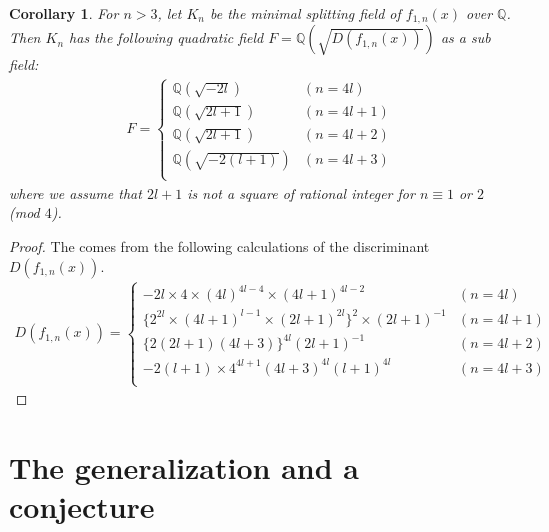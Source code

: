 \documentclass{article}
\newtheorem{coro}{Corollary}[section]
\begin{document}
\begin{coro}
\upshape
For $n>3$, let $K_{n}$ be the minimal splitting field of $f_{1,n}(x)$ over $\mathbb{Q}$. Then $K_{n}$ has the following quadratic field $F=\mathbb{Q}(\sqrt{D(f_{1,n}(x))})$ as a sub field:
\begin{eqnarray}
F=\left\{ \begin{array}{ll}
\mathbb{Q}(\sqrt{-2l}) & (n=4l) \\
\mathbb{Q}(\sqrt{2l+1})  & (n=4l+1) \\
\mathbb{Q}(\sqrt{2l+1})  & (n=4l+2) \\
\mathbb{Q}(\sqrt{-2(l+1)})  & (n=4l+3) \\
\end{array} \right.
\end{eqnarray}
where we assume that $2l+1$ is not a square of rational integer for $n\equiv 1$ or $2$ (mod $4$).
\end{coro}

\begin{proof}
The comes from the following calculations of the discriminant $D(f_{1,n}(x))$.
\begin{eqnarray}
D(f_{1,n}(x))=\left\{ \begin{array}{ll}
-2l\times 4\times (4l)^{4l-4}\times (4l+1)^{4l-2} & (n=4l) \\
\{2^{2l}\times (4l+1)^{l-1}\times(2l+1)^{2l}\}^{2}\times(2l+1)^{-1}  & (n=4l+1) \\
\{2(2l+1)(4l+3)\}^{4l}(2l+1)^{-1}  & (n=4l+2) \\
-2(l+1)\times 4^{4l+1}(4l+3)^{4l}(l+1)^{4l}  & (n=4l+3) \\
\end{array} \right.
\end{eqnarray}
\end{proof}

\section{The generalization and a conjecture}
\end{document}
